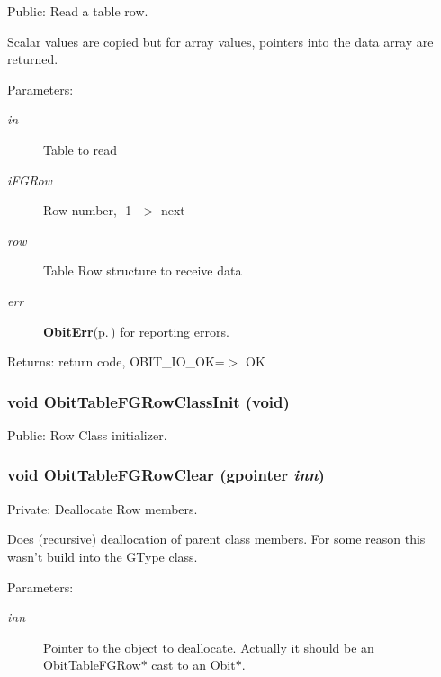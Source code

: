 Public: Read a table row. 

Scalar values are copied but for array values, pointers into the data array are returned. \begin{Desc}
\item[Parameters:]
\begin{description}
\item[{\em in}]Table to read \item[{\em i\-FGRow}]Row number, -1 -$>$ next \item[{\em row}]Table Row structure to receive data \item[{\em err}]{\bf Obit\-Err}{\rm (p.\,\pageref{structObitErr})} for reporting errors. \end{description}
\end{Desc}
\begin{Desc}
\item[Returns:]return code, OBIT\_\-IO\_\-OK=$>$ OK \end{Desc}
\subsubsection{\setlength{\rightskip}{0pt plus 5cm}void Obit\-Table\-FGRow\-Class\-Init (void)}\label{ObitTableFG_8c_a26}


Public: Row Class initializer. 

\subsubsection{\setlength{\rightskip}{0pt plus 5cm}void Obit\-Table\-FGRow\-Clear (gpointer {\em inn})}\label{ObitTableFG_8c_a7}


Private: Deallocate Row members. 

Does (recursive) deallocation of parent class members. For some reason this wasn't build into the GType class. \begin{Desc}
\item[Parameters:]
\begin{description}
\item[{\em inn}]Pointer to the object to deallocate. Actually it should be an Obit\-Table\-FGRow$\ast$ cast to an Obit$\ast$. \end{description}
\end{Desc}
